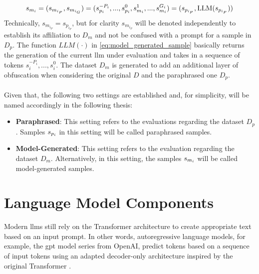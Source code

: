 \begin{equation}
    s_{m_i} = 
    (
    s_{m_{i_P}},
    s_{m_{i_G}}
    ) =
    (
        s_{p_i}^{-P_i},...,s_{p_i}^{0},
        s_{m_i}^1,...,s_{m_i}^{G_i}
    ) = 
    (
        s_{p_{i_P}}, 
        \operatorname{LLM}(s_{p_{i_P}})
    )
    \label{eq:model_generated_sample}
\end{equation}
Technically, $s_{m_{i_P}} = s_{p_{i_P}}$, but for clarity $s_{m_{i_P}}$ will be denoted independently to establish its affiliation to $D_m$ and not be confused with a prompt for a sample in $D_p$. The function $LLM(\cdot)$ in \autoref{eq:model_generated_sample} basically returns the generation of the current \acrshort{llm} under evaluation and takes in a sequence of tokens $s_i^{-P_i},...,s_i^{0}$. The dataset $D_m$ is generated to add an additional layer of obfuscation when considering the original $D$ and the paraphrased one $D_p$.
\\\\
Given that, the following two settings are established and, for simplicity, will be named accordingly in the following thesis:
\begin{itemize}
    \item \textbf{Paraphrased}: This setting refers to the evaluations regarding the dataset $D_p$. Samples $s_{p_i}$ in this setting will be called paraphrased samples.
    \item \textbf{Model-Generated}: This setting refers to the evaluation regarding the dataset $D_m$. Alternatively, in this setting, the samples $s_{m_i}$ will be called model-generated samples.
\end{itemize}

\section{Language Model Components}
Modern \acrlong{llm}s still rely on the Transformer architecture to create appropriate text based on an input prompt. In other words, autoregressive language models, for example, the \acrfull{gpt} model series from OpenAI, predict tokens based on a sequence of input tokens using an adapted decoder-only architecture inspired by the original Transformer \cite{DBLP:conf/nips/VaswaniSPUJGKP17}.


